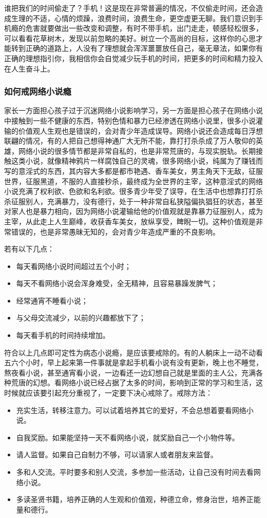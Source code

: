 谁把我们的时间偷走了？手机！这是现在非常普遍的情况，不仅偷走时间，还会造成生理的不适，心情的烦躁，浪费时间，浪费生命，更空虚更无聊。我们意识到手机瘾的危害就要做出一些改变和调整，有时不带手机，出门走走，顿感轻松很多，可以看看花草树木，发现以前忽略的美好。树立一个高尚的目标，这样你的心思才能转到正确的道路上，人没有了理想就会浑浑噩噩放任自己，毫无章法，如果你有正确的理想指引你，我相信你会自觉减少玩手机的时间，把更多的时间和精力投入在人生奋斗上。

\subsubsection{如何戒网络小说瘾}

家长一方面担心孩子过于沉迷网络小说影响学习，另一方面是担心孩子在网络小说中接触到一些不健康的东西，特别色情和暴力已经渗透在网络小说里，很多小说灌输的价值观人生观也是错误的，会对青少年造成误导。网络小说还会造成每日浮想联翩的情况，有的人把自己想得神通广大无所不能，靠打打杀杀成了万人敬仰的英雄，网络小说的很多情节都是非常自私的，也是非常荒唐的，与现实脱轨。长期接触这类小说，就像精神鸦片一样腐蚀自己的灵魂，很多网络小说，纯属为了赚钱而写的意淫式的东西，其内容大多都是都市艳遇、香车美女，男主角天下无敌，征服世界，征服黑道，不服的人直接秒杀，最终成为全世界的主宰，这种意淫式的网络小说充满了权利欲、色欲和名利欲。很多青少年受了误导，在生活中也想靠打打杀杀征服别人，充满暴力，没有德行，处于一种非常自私狭隘偏执猖狂的状态，甚至对家人也是暴力相向，因为网络小说灌输给他的价值观就是靠暴力征服别人，成为主宰，从此走上人生巅峰，收获香车美女，放纵享受，睥睨一切。这种价值观是非常错误的，也是非常愚昧无知的，会对青少年造成严重的不良影响。

若有以下几点：\begin{itemize}
    \item 每天看网络小说时间超过五个小时；
    \item 每天不看网络小说会浑身难受，全无精神，且容易暴躁发脾气；
    \item 经常通宵不睡看小说；
    \item 与父母交流减少，以前的兴趣都放下了；
    \item 每天看手机的时间持续增加。
\end{itemize} 符合以上几点即可定性为病态小说瘾，是应该要戒除的。有的人躺床上一动不动看五六个小时，早上起来第一件事就是拿起手机看小说有没有更新，晚上也不睡觉，熬夜看小说，甚至通宵看小说，一边看还一边幻想自己就是里面的主人公，充满各种荒唐的幻想。看网络小说已经占据了太多的时间，影响到正常的学习和生活，这时候就应该要引起充分重视了，一定要下决心戒除了。戒除方法：\begin{itemize}
    \item 充实生活，转移注意力。可以试着培养其它的爱好，不会总想着要看网络小说。
    \item 自我奖励。如果能坚持一天不看网络小说，就奖励自己一个小物件等。
    \item 请人监督。如果自己自制力不够，可以请家人或者朋友来监督。
    \item 多和人交流。平时要多和别人交流，多参加一些活动，让自己没有时间去看网络小说。
    \item 多读圣贤书籍，培养正确的人生观和价值观，种德立命，修身治世，培养正能量和德行。
\end{itemize}

